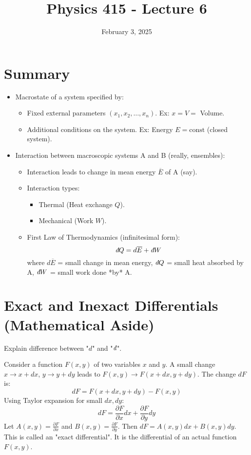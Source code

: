 \documentclass[11pt]{article}
\title{Physics 415 - Lecture 6}
\date{February 3, 2025}
\author{} %
\newcommand{\avg}[1]{\overline{#1}}
\newcommand{\pderiv}[2]{\frac{\partial #1}{\partial #2}}
\newcommand{\ethbar}{\text{\it{đ}}} %
\begin{document}
\maketitle
\thispagestyle{empty}

\section*{Summary}

\begin{itemize}
    \item Macrostate of a system specified by:
    \begin{itemize}
        \item Fixed external parameters $(x_1, x_2, \dots, x_n)$. Ex: $x=V=$ Volume.
        \item Additional conditions on the system. Ex: Energy $E = \text{const}$ (closed system).
    \end{itemize}
    \item Interaction between macroscopic systems A and B (really, ensembles):
    \begin{itemize}
        \item Interaction leads to change in mean energy $\avg{E}$ of A (say).
        \item Interaction types:
        \begin{itemize}
            \item Thermal (Heat exchange $Q$).
            \item Mechanical (Work $W$).
        \end{itemize}
        \item First Law of Thermodynamics (infinitesimal form):
        \[ \ethbar Q = d\avg{E} + \ethbar W \]
        where $d\avg{E}$ = small change in mean energy, $\ethbar Q$ = small heat absorbed by A, $\ethbar W$ = small work done *by* A.
    \end{itemize}
\end{itemize}

\section*{Exact and Inexact Differentials (Mathematical Aside)}

Explain difference between "$d$" and "$\ethbar$".

Consider a function $F(x,y)$ of two variables $x$ and $y$. A small change $x \to x+dx$, $y \to y+dy$ leads to $F(x,y) \to F(x+dx, y+dy)$. The change $dF$ is:
\[ dF = F(x+dx, y+dy) - F(x,y) \]
Using Taylor expansion for small $dx, dy$:
\[ dF = \pderiv{F}{x} dx + \pderiv{F}{y} dy \]
Let $A(x,y) = \pderiv{F}{x}$ and $B(x,y) = \pderiv{F}{y}$. Then $dF = A(x,y)dx + B(x,y)dy$.
This is called an "exact differential". It is the differential of an actual function $F(x,y)$.
\end{document}
